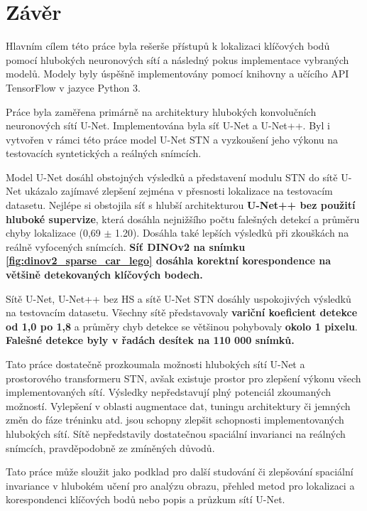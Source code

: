 \chapter{Závěr}
\label{sec:Chapter7}
Hlavním cílem této práce byla rešerše přístupů k lokalizaci klíčových bodů pomocí hlubokých neuronových sítí a následný pokus implementace vybraných modelů. Modely byly úspěšně implementovány pomocí knihovny a učícího API TensorFlow v jazyce Python 3.

Práce byla zaměřena primárně na architektury hlubokých konvolučních neuronových sítí U-Net. Implementována byla síť U-Net a U-Net++. Byl i vytvořen v rámci této práce model U-Net STN a vyzkoušení jeho výkonu na testovacích syntetických a reálných snímcích.

Model U-Net dosáhl obstojných výsledků a představení modulu STN do sítě U-Net ukázalo zajímavé zlepšení zejména v přesnosti lokalizace na testovacím datasetu. Nejlépe si obstojila síť s hlubší architekturou \textbf{U-Net++ bez použití hluboké supervize}, která dosáhla nejnižšího počtu falešných detekcí a průměru chyby lokalizace (0,69 $\pm$ 1.20). Dosáhla také lepších výsledků při zkouškách na reálně vyfocených snímcích. \textbf{Síť DINOv2 na snímku \ref{fig:dinov2_sparse_car_lego} dosáhla korektní korespondence na většině detekovaných klíčových bodech.}

Sítě U-Net, U-Net++ bez HS a sítě U-Net STN dosáhly uspokojivých výsledků na testovacím datasetu. Všechny sítě představovaly \textbf{variční koeficient detekce od 1,0 po 1,8} a průměry chyb detekce se většinou pohybovaly \textbf{okolo 1 pixelu}. \textbf{Falešné detekce byly v řadách desítek na 110 000 snímků.} 

Tato práce dostatečně prozkoumala možnosti hlubokých sítí U-Net a prostorového transformeru STN, avšak existuje prostor pro zlepšení výkonu všech implementovaných sítí. Výsledky nepředstavují plný potenciál zkoumaných možností. Vylepšení v oblasti augmentace dat, tuningu architektury či jemných změn do fáze tréninku atd. jsou schopny zlepšit schopnosti implementovaných hlubokých sítí. Sítě nepředstavily dostatečnou spaciální invarianci na reálných snímcích, pravděpodobně ze zmíněných důvodů.

Tato práce může sloužit jako podklad pro další studování či zlepšování spaciální invariance v hlubokém učení pro analýzu obrazu, přehled metod pro lokalizaci a korespondenci klíčových bodů nebo popis a průzkum sítí U-Net.
\endinput